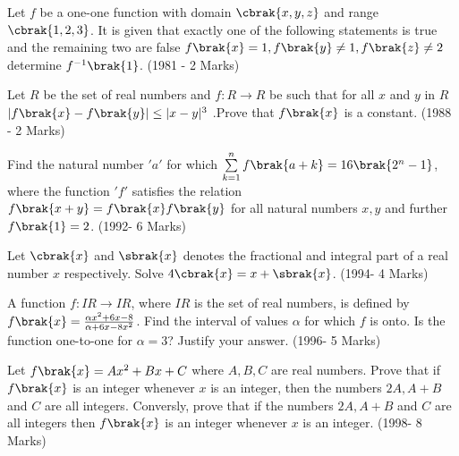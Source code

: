 \iffalse
  \title{Assignment-1}
  \author{Murra Rajesh Kumar Reddy}
  \section{subjective}
\fi
\item Let $f$ be a one-one function with domain $\cbrak{x,y,z}$ and range $\cbrak{1,2,3}$. It is given that exactly one of the following statements is true and the remaining two are false ${f\brak{x}=1},{f\brak{y}\neq1},{f\brak{z}\neq2}$ determine $f^{-1}\brak{1}$. \hfill(1981 - 2 Marks)
	\item Let $R$ be the set of real numbers and $f:R \to R$ be such that for all $x$ and $y$ in $R$ ${|f\brak{x}-f\brak{y}| \le |x-y|^3}$ .Prove that $f\brak{x}$ is a constant. \hfill(1988 - 2 Marks)
	\item Find the natural number $'a'$ for which ${\sum\limits_{k=1}^nf\brak{a+k}=16\brak{2^n -1}}$, where the function $'f'$ satisfies the relation ${f\brak{x+y}=f\brak{x}f\brak{y}}$ for all natural numbers $x, y$ and further ${f\brak{1}=2}$. \hfill(1992- 6 Marks)
	\item Let $\cbrak{x}$ and $\sbrak{x}$ denotes the fractional and integral part of a real number $x$ respectively. Solve ${4\cbrak{x}=x+\sbrak{x}}$. \hfill(1994- 4 Marks)
	\item A function $f:IR\to IR$, where $IR$ is the set of real numbers, is defined by ${f\brak{x}=\frac{\alpha x^2 +6x -8}{\alpha +6x-8x^2}}$. Find the interval of values $\alpha$ for which $f$ is onto. Is the function one-to-one for $\alpha=3$? Justify your answer. \hfill(1996- 5 Marks)
	\item Let ${f\brak{x}=Ax^2+Bx+C}$ where $A,B,C$ are real numbers. Prove that if $f\brak{x}$ is an integer whenever $x$ is an integer, then the numbers $2A, A+B$ and $C$ are all integers. Conversly, prove that if the numbers $2A, A+B$ and $C$ are all integers then $f\brak{x}$ is an integer whenever $x$ is an integer. \hfill(1998- 8 Marks)
